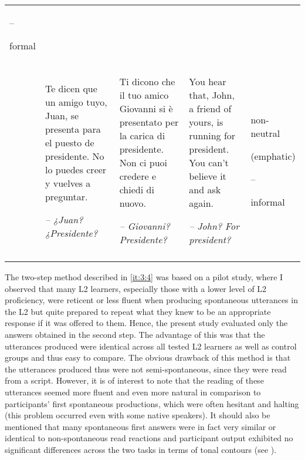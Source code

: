 \begin{sidewaystable}
\begin{tabularx}{\textwidth}{lQQQ>{\raggedright\arraybackslash}p{2cm}}
--

formal\\
 & Te dicen que un amigo tuyo, Juan, se presenta para el puesto de presidente. No lo puedes creer y vuelves a preguntar.

{\itshape -- ¿Juan? ¿Presidente?} & Ti dicono che il tuo amico Giovanni si è presentato per la carica di presidente. Non ci puoi credere e chiedi di nuovo.

{\itshape -- Giovanni? Presidente?} & You hear that, John, a friend of yours, is running for president. You can’t believe it and ask again.

{\itshape -- John? For president?} & non-neutral

(emphatic)

--

informal\\
\lspbottomrule
\end{tabularx}

\end{sidewaystable}



The two-step method described in \ref{it:3:4} was based on a pilot study, where I observed that many L2 learners, especially those with a lower level of L2 proficiency, were reticent or less fluent when producing spontaneous utterances in the L2 but quite prepared to repeat what they knew to be an appropriate response if it was offered to them. Hence, the present study evaluated only the answers obtained in the second step. The advantage of this was that the utterances produced were identical across all tested L2 learners as well as control groups and thus easy to compare. The obvious drawback of this method is that the utterances produced thus were not semi-spontaneous, since they were read from a script. However, it is of interest to note that the reading of these utterances seemed more fluent and even more natural in comparison to participants’ first spontaneous productions, which were often hesitant and halting (this problem occurred even with some native speakers). It should also be mentioned that many spontaneous first answers were in fact very similar or identical to non-spontaneous read reactions and participant output exhibited no significant differences across the two tasks in terms of tonal contours (see ).




